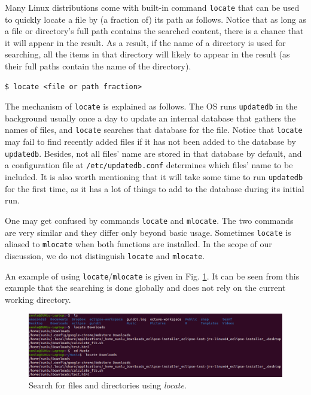 Many Linux distributions come with built-in command \verb|locate| that can be used to quickly locate a file by (a fraction of) its path as follows. Notice that as long as a file or directory's full path contains the searched content, there is a chance that it will appear in the result. As a result, if the name of a directory is used for searching, all the items in that directory will likely to appear in the result (as their full paths contain the name of the directory).
\begin{lstlisting}
$ locate <file or path fraction>
\end{lstlisting}

The mechanism of \verb|locate| is explained as follows. The OS runs \verb|updatedb| in the background usually once a day to update an internal database that gathers the names of files, and \verb|locate| searches that database for the file. Notice that \verb|locate| may fail to find recently added files if it has not been added to the database by \verb|updatedb|. Besides, not all files' name are stored in that database by default, and a configuration file at \verb|/etc/updatedb.conf| determines which files' name to be included. It is also worth mentioning that it will take some time to run \verb|updatedb| for the first time, as it has a lot of things to add to the database during its initial run.

One may get confused by commands \verb|locate| and \verb|mlocate|. The two commands are very similar and they differ only beyond basic usage. Sometimes \verb|locate| is aliased to \verb|mlocate| when both functions are installed. In the scope of our discussion, we do not distinguish \verb|locate| and \verb|mlocate|.

An example of using \verb|locate|/\verb|mlocate| is given in Fig. \ref{ch:fm:fig:locateexp}. It can be seen from this example that the searching is done globally and does not rely on the current working directory.
\begin{figure}[htbp]
	\centering
	\includegraphics[width=\textwidth]{chapters/part-1/figures/locateexp.png}
	\caption{Search for files and directories using \textit{locate}.} \label{ch:fm:fig:locateexp}
\end{figure}

